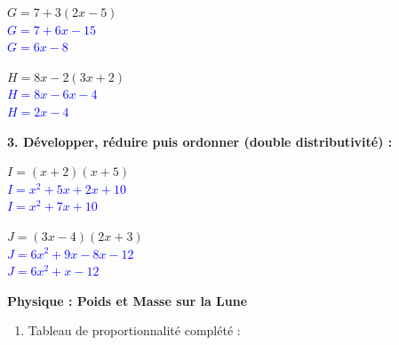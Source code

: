 \documentclass[a4paper]{book}
\begin{document}
{\begin{exercice}
        \noindent
        \begin{minipage}{0.48\textwidth}
            $G = 7 + 3(2x - 5)$\\
            \textcolor{blue}{$G = 7 + 6x - 15$}\\
            \textcolor{blue}{$G = 6x - 8$}
            \vspace{0.5cm}
        \end{minipage}\hfill
        \begin{minipage}{0.48\textwidth}
            $H = 8x - 2(3x + 2)$\\
            \textcolor{blue}{$H = 8x - 6x - 4$}\\
            \textcolor{blue}{$H = 2x - 4$}
            \vspace{0.5cm}
        \end{minipage}
    
        \medskip
        \textbf{3. Développer, réduire puis ordonner (double distributivité) :}
        
        \noindent
        \begin{minipage}{0.48\textwidth}
            $I = (x + 2)(x + 5)$\\
            \textcolor{blue}{$I = x^2 + 5x + 2x + 10$}\\
            \textcolor{blue}{$I = x^2 + 7x + 10$}
            \vspace{0.5cm}
        \end{minipage}\hfill
        \begin{minipage}{0.48\textwidth}
            $J = (3x - 4)(2x + 3)$\\
            \textcolor{blue}{$J = 6x^2 + 9x - 8x - 12$}\\
            \textcolor{blue}{$J = 6x^2 + x - 12$}
            \vspace{0.5cm}
        \end{minipage}
    \end{exercice}

    \vspace{0.5cm}
    
    \begin{exercice}
        \textbf{Physique : Poids et Masse sur la Lune} 
            
        \begin{enumerate}
            \item Tableau de proportionnalité complété :


\end{enumerate}
\end{exercice}}
\end{document}
